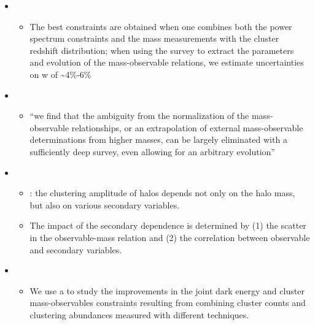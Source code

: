 \documentclass[letterpaper,10pt,english]{sphinxmanual}
\begin{document}
\begin{itemize}
\begin{itemize}
\end{itemize}

\item {} 
\begin{itemize}
\item {} 
The best constraints are obtained when one combines both the power
spectrum constraints and the mass measurements with the cluster
redshift distribution; when using the survey to extract the
parameters and evolution of the mass-observable relations, we
estimate uncertainties on w of \textasciitilde{}4\%-6\%

\end{itemize}

\item {} 
\begin{itemize}
\item {} 
“we find that the ambiguity from the normalization of the
mass-observable relationships, or an extrapolation of external
mass-observable determinations from higher masses, can be largely
eliminated with a sufficiently deep survey, even allowing for an
arbitrary evolution”

\end{itemize}

\item {} 
\begin{itemize}
\item {} 
: the clustering amplitude of halos depends
not only on the halo mass, but also on various secondary
variables.

\item {} 
The impact of the secondary dependence is determined by (1) the
scatter in the observable-mass relation and (2) the correlation
between observable and secondary variables. 

\end{itemize}

\item {} 
\begin{itemize}
\item {} 
We use a  to study the improvements in
the joint dark energy and cluster mass-observables constraints
resulting from combining cluster counts and clustering abundances
measured with different techniques.


\end{itemize}
\end{itemize}
\end{document}
